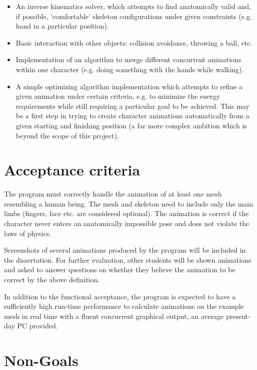 \documentclass{article}
\begin{document}
\begin{itemize}
\item An inverse kinematics solver, which attempts to find anatomically
  valid and, if possible, `comfortable' skeleton configurations under
  given constraints (e.g. hand in a particular position).

\item Basic interaction with other objects: collision avoidance, throwing
  a ball, etc.

\item Implementation of an algorithm to merge different concurrent
  animations within one character (e.g. doing something with the hands
  while walking).

\item A simple optimizing algorithm implementation which attempts to
  refine a given animation under certain criteria, e.g. to minimize
  the energy requirements while still requiring a particular goal to
  be achieved. This may be a first step in trying to create character
  animations automatically from a given starting and finishing
  position (a far more complex ambition which is beyond the scope of
  this project).
\end{itemize}


\section{Acceptance criteria}

The program must correctly handle the animation of at least one mesh
resembling a human being. The mesh and skeleton need to include only
the main limbs (fingers, face etc. are considered optional). The
animation is correct if the character never enters an anatomically
impossible pose and does not violate the laws of physics.

Screenshots of several animations produced by the program will be
included in the dissertation. For further evaluation, other students
will be shown animations and asked to answer questions on whether they
believe the animation to be correct by the above definition.

In addition to the functional acceptance, the program is expected to
have a sufficiently high run-time performance to calculate animations
on the example mesh in real time with a fluent concurrent graphical
output, an average present-day PC provided.


\section{Non-Goals}
\end{document}
